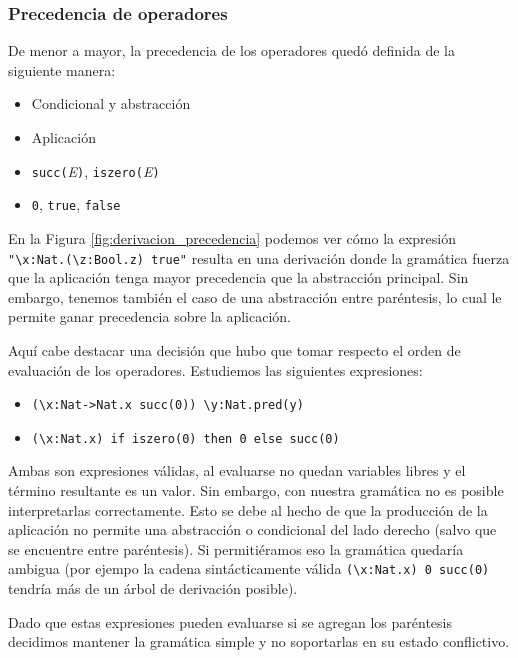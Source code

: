 \documentclass[11pt]{article}
\begin{document}
\subsubsection{Precedencia de operadores}

De menor a mayor, la precedencia de los operadores quedó definida de la
siguiente manera:

\begin{itemize}
  \item Condicional y abstracción
  \item Aplicación
  \item \verb|succ(|\emph{E}\verb|)|, \verb|iszero(|\emph{E}\verb|)|
  \item \verb|0|, \verb|true|, \verb|false|
\end{itemize}

En la Figura \ref{fig:derivacion_precedencia} podemos ver cómo la
expresión \verb|"\x:Nat.(\z:Bool.z) true"| resulta en una derivación donde
la gramática fuerza que la aplicación tenga mayor precedencia que la
abstracción principal. Sin embargo, tenemos también el caso de una abstracción 
entre paréntesis, lo cual le permite ganar precedencia sobre la aplicación.

Aquí cabe destacar una decisión que hubo que tomar respecto el orden de
evaluación de los operadores. Estudiemos las siguientes expresiones:

\begin{itemize}
	\item \verb|(\x:Nat->Nat.x succ(0)) \y:Nat.pred(y)|
	\item \verb|(\x:Nat.x) if iszero(0) then 0 else succ(0)|
\end{itemize}

Ambas son expresiones válidas, al evaluarse no quedan variables libres y
el término resultante es un valor. Sin embargo, con nuestra gramática no
es posible interpretarlas correctamente. Esto se debe al hecho de que la
producción de la aplicación no permite una abstracción o condicional del
lado derecho (salvo que se encuentre entre paréntesis). Si permitiéramos 
eso la gramática quedaría ambigua (por ejempo la cadena sintácticamente
válida \verb|(\x:Nat.x) 0 succ(0)| tendría más de un árbol de
derivación posible).

Dado que estas expresiones pueden evaluarse si se agregan los paréntesis
decidimos mantener la gramática simple y no soportarlas en su estado
conflictivo.
\end{document}
